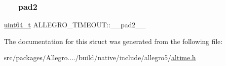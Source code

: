 \subsubsection{\texorpdfstring{\+\_\+\+\_\+pad2\+\_\+\+\_\+}{\_\_pad2\_\_}}
{\footnotesize\ttfamily \hyperlink{alwatcom_8h_a104204cb123abb831baa5adcfffc64e0}{uint64\+\_\+t} A\+L\+L\+E\+G\+R\+O\+\_\+\+T\+I\+M\+E\+O\+U\+T\+::\+\_\+\+\_\+pad2\+\_\+\+\_\+}



The documentation for this struct was generated from the following file\+:\begin{DoxyCompactItemize}
\item 
src/packages/\+Allegro..../build/native/include/allegro5/\hyperlink{altime_8h}{altime.\+h}\end{DoxyCompactItemize}

